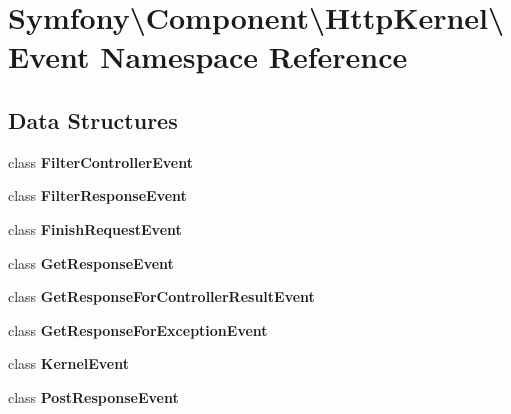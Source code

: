 \section{Symfony\textbackslash{}Component\textbackslash{}Http\+Kernel\textbackslash{}Event Namespace Reference}
\label{namespace_symfony_1_1_component_1_1_http_kernel_1_1_event}
\subsection*{Data Structures}
\begin{DoxyCompactItemize}
\item 
class {\bf Filter\+Controller\+Event}
\item 
class {\bf Filter\+Response\+Event}
\item 
class {\bf Finish\+Request\+Event}
\item 
class {\bf Get\+Response\+Event}
\item 
class {\bf Get\+Response\+For\+Controller\+Result\+Event}
\item 
class {\bf Get\+Response\+For\+Exception\+Event}
\item 
class {\bf Kernel\+Event}
\item 
class {\bf Post\+Response\+Event}
\end{DoxyCompactItemize}
